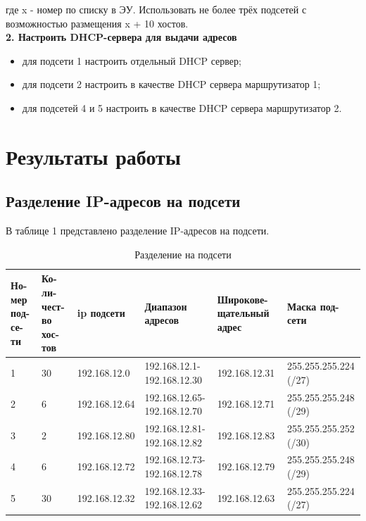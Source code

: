 \documentclass[12pt]{report}
\begin{document}
где x - номер по списку в ЭУ. Использовать не более трёх подсетей с возможностью размещения x + 10 хостов.\\

\textbf{2. Настроить DHCP-сервера для выдачи адресов}

\begin{itemize}
	\item для подсети 1 настроить отдельный DHCP сервер;
	\item для подсети 2 настроить в качестве DHCP сервера маршрутизатор 1;
	\item для подсетей 4 и 5 настроить в качестве DHCP сервера маршрутизатор 2.
\end{itemize}

\section*{Результаты работы}

\subsection*{Разделение IP-адресов на подсети}

В таблице 1 представлено разделение IP-адресов на подсети.

\begin{table}[H]
	\centering
	\label{tab:networks}
	\begin{tabular}{|p{0.8cm}|p{1cm}|p{3cm}|p{3cm}|p{3cm}|p{3.2cm}|}
		\hline
		Но-мер под-се-ти & Ко-ли-чест-во хос-тов & ip подсети & Диапазон адресов & Широкове-щательный адрес & Маска под-сети \\
		\hline
		1 & 30 & 192.168.12.0 & 192.168.12.1-192.168.12.30 & 192.168.12.31 & 255.255.255.224 (/27) \\
		\hline
		2 & 6 & 192.168.12.64 & 192.168.12.65-192.168.12.70 & 192.168.12.71 & 255.255.255.248 (/29) \\
		\hline
		3 & 2 & 192.168.12.80 & 192.168.12.81-192.168.12.82 & 192.168.12.83 & 255.255.255.252 (/30) \\
		\hline
		4 & 6 & 192.168.12.72 & 192.168.12.73-192.168.12.78 & 192.168.12.79 & 255.255.255.248 (/29) \\
		\hline
		5 & 30 & 192.168.12.32 & 192.168.12.33-192.168.12.62 & 192.168.12.63 & 255.255.255.224 (/27) \\
		\hline
	\end{tabular}
	\caption{Разделение на подсети}
\end{table}
\end{document}
